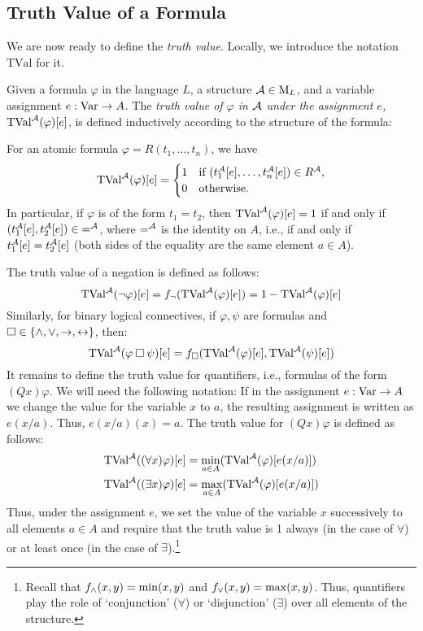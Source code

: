\subsection{Truth Value of a Formula}\label{subsection:truth-value-of-formula}

We are now ready to define the \emph{truth value}. Locally, we introduce the notation $\mathrm{TVal}$ for it.

\begin{definition}
Given a formula $\varphi$ in the language $L$, a structure $\mathcal{A}\in\operatorname{M}_L$, and a variable assignment $e:\operatorname{Var}\to A$. The \emph{truth value of $\varphi$ in $\mathcal{A}$ under the assignment $e$, $\mathrm{TVal}^{\mathcal{A}}(\varphi)[e]$}, is defined inductively according to the structure of the formula:

For an atomic formula $\varphi=R(t_1,\dots,t_n)$, we have 
$$
\mathrm{TVal}^{\mathcal{A}}(\varphi)[e]=
\begin{cases}
    1 & \text{if }(t_1^{\mathcal{A}}[e],\dots,t_n^{\mathcal{A}}[e])\in R^{\mathcal{A}},\\
    0 & \text{otherwise.}    
\end{cases}
$$
In particular, if $\varphi$ is of the form $t_1=t_2$, then $\mathrm{TVal}^{\mathcal{A}}(\varphi)[e]=1$ if and only if $(t_1^{\mathcal{A}}[e],t_2^{\mathcal{A}}[e])\in {=^{\mathcal{A}}}$, where $=^{\mathcal{A}}$ is the identity on $A$, i.e., if and only if $t_1^{\mathcal{A}}[e]=t_2^{\mathcal{A}}[e]$ (both sides of the equality are the same element $a\in A$).

The truth value of a negation is defined as follows:
$$
\mathrm{TVal}^{\mathcal{A}}(\neg \varphi)[e]=f_\neg(\mathrm{TVal}^{\mathcal{A}}(\varphi)[e])=1-\mathrm{TVal}^{\mathcal{A}}(\varphi)[e]
$$
Similarly, for binary logical connectives, if $\varphi,\psi$ are formulas and ${\mathbin{\square}}\in\{{\land},{\lor},{\mathbin{\rightarrow}},{\mathbin{\leftrightarrow}}\}$, then:
$$
\mathrm{TVal}^{\mathcal{A}}(\varphi\mathbin{\square}\psi)[e]=f_{\mathbin{\square}}(\mathrm{TVal}^{\mathcal{A}}(\varphi)[e],\mathrm{TVal}^{\mathcal{A}}(\psi)[e])
$$
It remains to define the truth value for quantifiers, i.e., formulas of the form $(Qx)\varphi$. We will need the following notation: If in the assignment $e:\operatorname{Var}\to A$ we change the value for the variable $x$ to $a$, the resulting assignment is written as $e(x/a)$. Thus, $e(x/a)(x)=a$. The truth value for $(Qx)\varphi$ is defined as follows:
\begin{align*}
    \mathrm{TVal}^{\mathcal{A}}((\forall x)\varphi)[e]&=\min_{a\in A}(\mathrm{TVal}^{\mathcal{A}}(\varphi)[e(x/a)])\\ 
    \mathrm{TVal}^{\mathcal{A}}((\exists x)\varphi)[e]&=\max_{a\in A}(\mathrm{TVal}^{\mathcal{A}}(\varphi)[e(x/a)])
\end{align*}
Thus, under the assignment $e$, we set the value of the variable $x$ successively to all elements $a\in A$ and require that the truth value is 1 always (in the case of $\forall$) or at least once (in the case of $\exists$).\footnote{Recall that $f_{\land}(x,y)=\min(x,y)$ and $f_{\lor}(x,y)=\max(x,y)$. Thus, quantifiers play the role of `conjunction' ($\forall$) or `disjunction' ($\exists$) over all elements of the structure.}
\end{definition}

